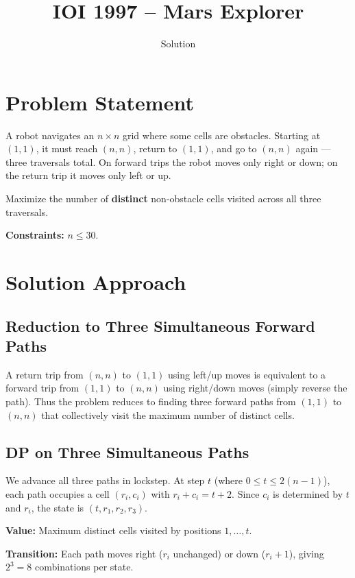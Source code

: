 \documentclass[11pt,a4paper]{article}
\title{IOI 1997 -- Mars Explorer}
\author{Solution}
\date{}
\begin{document}
\maketitle

\section{Problem Statement}

A robot navigates an $n \times n$ grid where some cells are obstacles.
Starting at $(1,1)$, it must reach $(n,n)$, return to $(1,1)$, and go to $(n,n)$ again ---
three traversals total. On forward trips the robot moves only right or down;
on the return trip it moves only left or up.

Maximize the number of \textbf{distinct} non-obstacle cells visited across all
three traversals.

\medskip
\noindent\textbf{Constraints:} $n \le 30$.

\section{Solution Approach}

\subsection{Reduction to Three Simultaneous Forward Paths}

A return trip from $(n,n)$ to $(1,1)$ using left/up moves is equivalent to a forward
trip from $(1,1)$ to $(n,n)$ using right/down moves (simply reverse the path).
Thus the problem reduces to finding three forward paths from $(1,1)$ to $(n,n)$
that collectively visit the maximum number of distinct cells.

\subsection{DP on Three Simultaneous Paths}

We advance all three paths in lockstep. At step $t$ (where $0 \le t \le 2(n-1)$),
each path occupies a cell $(r_i, c_i)$ with $r_i + c_i = t + 2$. Since $c_i$ is
determined by $t$ and $r_i$, the state is $(t, r_1, r_2, r_3)$.

\medskip
\noindent\textbf{Value:} Maximum distinct cells visited by positions $1, \ldots, t$.

\medskip
\noindent\textbf{Transition:} Each path moves right ($r_i$ unchanged) or down ($r_i + 1$),
giving $2^3 = 8$ combinations per state.
\end{document}
